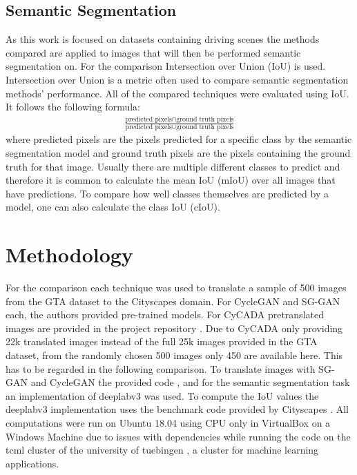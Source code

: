 \subsection{Semantic Segmentation}
As this work is focused on datasets containing driving scenes the methods compared are applied to images that will then be performed semantic segmentation on. For the comparison Intersection over Union (IoU) is used. Intersection over Union is a metric often used to compare semantic segmentation methods' performance. All of the compared techniques were evaluated using IoU. It follows the following formula:
\begin{align*}
	\frac{\text{predicted pixels} \cap \text{ground truth pixels}}{\text{predicted pixels} \cup \text{ground truth pixels}}
\end{align*}
where predicted pixels are the pixels predicted for a specific class by the semantic segmentation model and ground truth pixels are the pixels containing the ground truth for that image. Usually there are multiple different classes to predict and therefore it is common to calculate the mean IoU (mIoU) over all images that have predictions. To compare how well classes themselves are predicted by a model, one can also calculate the class IoU (cIoU).

\section{Methodology}
For the comparison each technique was used to translate a sample of 500 images from the GTA dataset to the Cityscapes domain. For CycleGAN and SG-GAN each, the authors provided pre-trained models. For CyCADA pretranslated images are provided in the project repository \cite{CyCADA}. Due to CyCADA only providing 22k translated images instead of the full 25k images provided in the GTA dataset, from the randomly chosen 500 images only 450 are available here. This has to be regarded in the following comparison. To translate images with SG-GAN and CycleGAN the provided code \cite{SG},\cite{Cycle} and for the semantic segmentation task an implementation \cite{DLR} of deeplabv3 \cite{DBLP:journals/corr/ChenPSA17} was used. To compute the IoU values the deeplabv3 implementation uses the benchmark code provided by Cityscapes \cite{CSR}. All computations were run on Ubuntu 18.04 using CPU only in VirtualBox on a Windows Machine due to issues with dependencies while running the code on the tcml cluster of the university of tuebingen \cite{tcml}, a cluster for machine learning applications.

